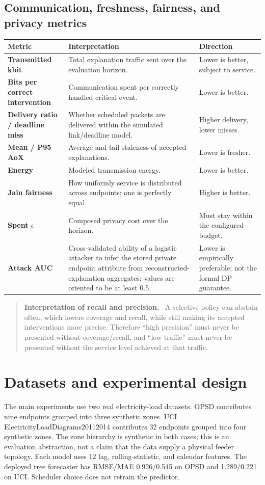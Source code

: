 \documentclass[11pt]{article}
\newenvironment{interpretationbox}[1]{%
  \begin{quote}\small\noindent\textbf{#1}\ }{\end{quote}}
\begin{document}
\subsection{Communication, freshness, fairness, and privacy metrics}
\begin{center}
\small
\begin{tabularx}{\textwidth}{>{\bfseries}p{} X p{}}
\toprule
Metric & Interpretation & Direction \\
\midrule
Transmitted kbit & Total explanation traffic sent over the evaluation horizon. & Lower is better, subject to service. \\
Bits per correct intervention & Communication spent per correctly handled critical event. & Lower is better. \\
Delivery ratio / deadline miss & Whether scheduled packets are delivered within the simulated link/deadline model. & Higher delivery, lower misses. \\
Mean / P95 AoX & Average and tail staleness of accepted explanations. & Lower is fresher. \\
Energy & Modeled transmission energy. & Lower is better. \\
Jain fairness & How uniformly service is distributed across endpoints; one is perfectly equal. & Higher is better. \\
Spent $\epsilon$ & Composed privacy cost over the horizon. & Must stay within the configured budget. \\
Attack AUC & Cross-validated ability of a logistic attacker to infer the stored private endpoint attribute from reconstructed-explanation aggregates; values are oriented to be at least 0.5. & Lower is empirically preferable; not the formal DP guarantee. \\
\bottomrule
\end{tabularx}
\end{center}

\begin{interpretationbox}{Interpretation of recall and precision.}
A selective policy can abstain often, which lowers coverage and recall, while still making its accepted interventions more precise. Therefore ``high precision'' must never be presented without coverage/recall, and ``low traffic'' must never be presented without the service level achieved at that traffic.
\end{interpretationbox}

\section{Datasets and experimental design}
The main experiments use two real electricity-load datasets. OPSD contributes nine endpoints grouped into three synthetic zones. UCI ElectricityLoadDiagrams20112014 contributes 32 endpoints grouped into four synthetic zones. The zone hierarchy is synthetic in both cases; this is an evaluation abstraction, not a claim that the data supply a physical feeder topology. Each model uses 12 lag, rolling-statistic, and calendar features. The deployed tree forecaster has RMSE/MAE 0.926/0.545 on OPSD and 1.289/0.221 on UCI. Scheduler choice does not retrain the predictor.
\end{document}
